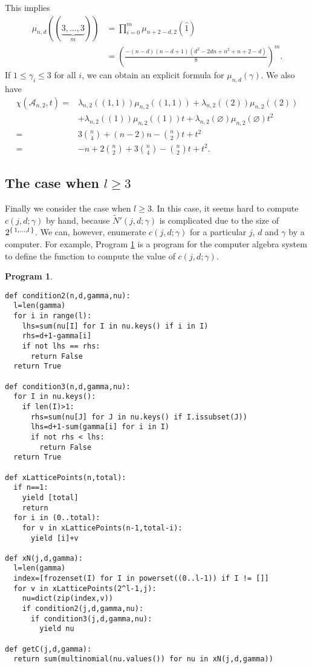 \documentclass{wstmp}
\newtheorem{program}{Program}[section]
\begin{document}
This implies
\begin{align*}
\mu_{n,d}((\underbrace{3,\ldots,3}_{m}))
&=\prod_{i=0}^{m} \mu_{n+2-d,2}({\hat{1}})\\
&=\left(\frac{-(n - d)(n - d + 1)(d^2 - 2dn + n^2+ n + 2- d)}{8}\right)^m.  
\end{align*}
If $1\leq \gamma_i\leq 3$ for all $i$,
we can obtain an explicit formula for 
$\mu_{n,d}(\gamma)$.
We also have
\begin{align*}
\chi({\mathcal{A}}_{n,2},t)
=&
\lambda_{n,2}((1,1))\mu_{n,2}((1,1))+
\lambda_{n,2}((2))\mu_{n,2}((2))
\\&
+\lambda_{n,2}((1))\mu_{n,2}((1))t+
\lambda_{n,2}({\varnothing})\mu_{n,2}({\varnothing})t^2
\\
=&
3\binom{n}{4}
+(n-2)n
-\binom{n}{2}t+
t^2\\
=&
-n
+2\binom{n}{2}
+3\binom{n}{4}
-\binom{n}{2}t+t^2.
\end{align*}

\subsection{The case when $l\geq 3$}
Finally 
we consider the case when $l\geq 3$.
In this case, it seems hard to compute $c(j,d;\gamma)$
by hand,
because $\tilde N'(j,d;\gamma)$ is complicated 
due to the size of $2^{\set{1,\ldots,l}}$.
We can, however, enumerate $c(j,d;\gamma)$
for a particular $j$, $d$ and $\gamma$
by a computer.
For example, Program \ref{prog:sage} is a program for 
the computer algebra system \cite{sage}
to define the function  to compute
the value of $c(j,d;\gamma)$.

\begin{program}\label{prog:sage}
\footnotesize
\begin{verbatim}
def condition2(n,d,gamma,nu):
  l=len(gamma)
  for i in range(l):
    lhs=sum(nu[I] for I in nu.keys() if i in I)
    rhs=d+1-gamma[i]
    if not lhs == rhs:
      return False
  return True
    
def condition3(n,d,gamma,nu):
  for I in nu.keys():
    if len(I)>1:
      rhs=sum(nu[J] for J in nu.keys() if I.issubset(J))
      lhs=d+1-sum(gamma[i] for i in I)
      if not rhs < lhs:
        return False
  return True

def xLatticePoints(n,total):
  if n==1:
    yield [total]
    return
  for i in (0..total):
    for v in xLatticePoints(n-1,total-i):
      yield [i]+v

def xN(j,d,gamma):
  l=len(gamma)
  index=[frozenset(I) for I in powerset((0..l-1)) if I != []]
  for v in xLatticePoints(2^l-1,j):
    nu=dict(zip(index,v))
    if condition2(j,d,gamma,nu):
      if condition3(j,d,gamma,nu):
        yield nu

def getC(j,d,gamma):
  return sum(multinomial(nu.values()) for nu in xN(j,d,gamma))
\end{verbatim}
\end{program}
\normalsize
\end{document}
